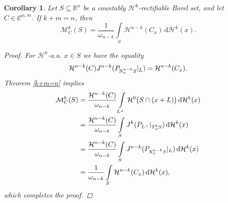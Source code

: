 \documentclass[pdflatex,sn-mathphys-num]{sn-jnl}
\theoremstyle{plain}
\newtheorem{corollary}[theorem]{Corollary}
\theoremstyle{definition}
\newcommand{\dH}[1]{\,\mathrm d\mathcal{H}^{#1}}
\begin{document}
\begin{corollary}
    Let $S\subseteq\mathbb{R}^n$ be a countably $\mathcal{H}^k$-rectifiable Borel set, and let $C\in\mathcal{C}^{n, m}$. If $k+m=n$, then $$\mathcal{M}^k_C(S)=\frac{1}{\omega_{n-k}}\int\limits_{S}\mathcal{H}^{n-k}(C_x)\dH{k}(x).$$
    \begin{proof} For $\mathcal{H}^k$-a.a. $x\in S$ we have the equality $$\mathcal{H}^{n-k}(C)J^{n-k}(P_{\textup{N}^{n-k}_xS}|_L)=\mathcal{H}^{n-k}(C_x).$$
        Theorem \ref{k+m=n} implies \begin{equation*}
            \begin{split}
                \mathcal{M}^k_C(S)&=\frac{\mathcal{H}^{n-k}(C)}{\omega_{n-k}}\int\limits_{L^{\perp}}\mathcal{H}^{0}\big(S\cap (x+L)\big)\dH{k}(x)\\&=\frac{\mathcal{H}^{n-k}(C)}{\omega_{n-k}}\int\limits_{S}J^k(P_{L^{\perp}}|_{\textup{T}^{k}_xS})\dH{k}(x)\\&=\frac{\mathcal{H}^{n-k}(C)}{\omega_{n-k}}\int\limits_{S}J^{n-k}(P_{\textup{N}^{n-k}_xS}|_L)\dH{k}(x)\\&=\frac{1}{\omega_{n-k}}\int\limits_{S}\mathcal{H}^{n-k}(C_x)\dH{k}(x),
            \end{split}
        \end{equation*} which completes the proof.
    \end{proof}
\end{corollary}
\end{document}
